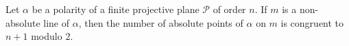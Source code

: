 Let $\alpha$ be a polarity of a finite projective plane $\mathcal{P}$ of order $n$. If $m$ is a non-absolute line of $\alpha$, then the number of absolute points of $\alpha$ on $m$ is congruent to $n+1$ modulo $2$.
